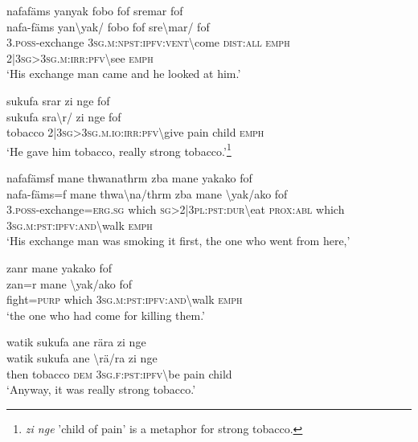 \ea\label{ex:5:a1500}
nafafäms yanyak fobo fof sremar fof\\
\gll nafa-fäms	yan{\textbackslash}yak/	fobo	fof	sre{\textbackslash}mar/	fof\\
     3.\textsc{poss}-exchange	3\textsc{sg}.\textsc{m}:\textsc{npst}:\textsc{ipfv}:\textsc{vent}{\textbackslash}come	\textsc{dist}:\textsc{all}	\textsc{emph}	2|3\textsc{sg}>3\textsc{sg}.\textsc{m}:\textsc{irr}:\textsc{pfv}{\textbackslash}see	\textsc{emph}\\
\glt `His exchange man came and he looked at him.'
\z

\ea\label{ex:5:a1502}
sukufa srar zi nge fof\\
\gll sukufa	sra{\textbackslash}r/	zi	nge	fof\\
     tobacco	2|3\textsc{sg}>3\textsc{sg}.\textsc{m}.\textsc{io}:\textsc{irr}:\textsc{pfv}{\textbackslash}give	pain	child	\textsc{emph}\\
\glt `He gave him tobacco, really strong tobacco.'\footnote{\textit{zi nge} 'child of pain' is a metaphor for strong tobacco.}
\z

\ea\label{ex:5:a5644}
nafafämsf mane thwanathrm zba mane yakako fof\\
\gll nafa-fäms=f	mane	thwa{\textbackslash}na/thrm	zba	mane	{\textbackslash}yak/ako	fof\\
     3.\textsc{poss}-exchange=\textsc{erg}.\textsc{sg}	which	\textsc{sg}>2|3\textsc{pl}:\textsc{pst}:\textsc{dur}{\textbackslash}eat	\textsc{prox}:\textsc{abl}	which	3\textsc{sg}.\textsc{m}:\textsc{pst}:\textsc{ipfv}:\textsc{and}{\textbackslash}walk	\textsc{emph}\\
\glt `His exchange man was smoking it first, the one who went from here,'
\z

\ea\label{ex:5:a1503}
zanr mane yakako fof\\
\gll zan=r	mane	{\textbackslash}yak/ako	fof\\
     fight=\textsc{purp}	which	3\textsc{sg}.\textsc{m}:\textsc{pst}:\textsc{ipfv}:\textsc{and}{\textbackslash}walk	\textsc{emph}\\
\glt `the one who had come for killing them.'
\z

\ea\label{ex:5:a1504}
watik sukufa ane rära zi nge\\
\gll watik	sukufa	ane	{\textbackslash}rä/ra	zi	nge\\
     then	tobacco	\textsc{dem}	3\textsc{sg}.\textsc{f}:\textsc{pst}:\textsc{ipfv}{\textbackslash}be	pain	child\\
\glt `Anyway, it was really strong tobacco.'
\z

